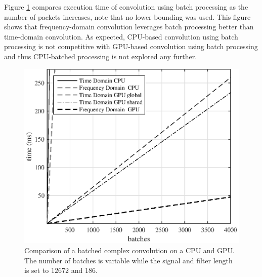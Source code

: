 Figure \ref{fig:CPUvsGPU_varyBatches_186taps_12672signal} compares execution time of convolution using batch processing as the number of packets increases, note that no lower bounding was used.
This figure shows that frequency-domain convolution leverages batch processing better than time-domain convolution.
As expected, CPU-based convolution using batch processing is not competitive with GPU-based convolution using batch processing and thus CPU-batched processing is not explored any further.
\begin{figure}
	\centering\includegraphics[width=5in]{figures/gpu_intro/CPUvsGPU_varyBatches_186taps_12672signal.eps}
	\caption{Comparison of a batched complex convolution on a CPU and GPU. The number of batches is variable while the signal and filter length is set to $12672$ and $186$.}
	\label{fig:CPUvsGPU_varyBatches_186taps_12672signal}
\end{figure}

